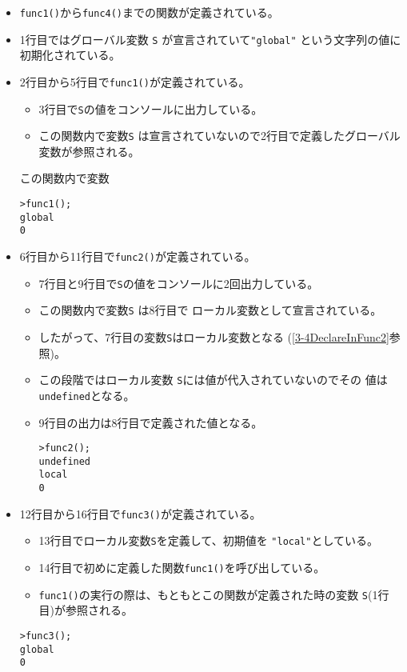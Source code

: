 \documentclass[a4j]{jarticle}
\begin{document}
\begin{itemize}
 \item \verb+func1()+から\verb+func4()+までの関数が定義されている。
 \item 1行目ではグローバル変数 \verb+S+ が宣言されていて\verb+"global"+
       という文字列の値に初期化されている。
 \item 2行目から5行目で\verb+func1()+が定義されている。
\begin{itemize}
 \item 3行目で\verb+S+の値をコンソールに出力している。
 \item この関数内で変数\verb+S+
       は宣言されていないので2行目で定義したグローバル変数が参照される。
\end{itemize}この関数内で変数
       
\begin{Verbatim}
>func1();
global
0
\end{Verbatim}
 \item 6行目から11行目で\verb+func2()+が定義されている。
\begin{itemize}
 \item 7行目と9行目で\verb+S+の値をコンソールに2回出力している。
 \item この関数内で変数\verb+S+ は8行目で
       ローカル変数として宣言されている。
 \item したがって、7行目の変数\verb+S+はローカル変数となる
       (\ref{3-4DeclareInFunc2}参照)。
 \item この段階ではローカル変数 \verb+S+には値が代入されていないのでその
       値は\verb+undefined+となる。
 \item 9行目の出力は8行目で定義された値となる。
\begin{Verbatim}
>func2();
undefined
local    
0
\end{Verbatim}
\end{itemize}
 \item 12行目から16行目で\verb+func3()+が定義されている。
\begin{itemize}
 \item 13行目でローカル変数\verb+S+を定義して、初期値を
       \verb+"local"+としている。
 \item 14行目で初めに定義した関数\verb+func1()+を呼び出している。
 \item \verb+func1()+の実行の際は、もともとこの関数が定義された時の変数
       \verb+S+(1行目)が参照される。
\end{itemize}
\begin{Verbatim}
>func3();
global
0
\end{Verbatim}

\end{itemize}
\end{document}
